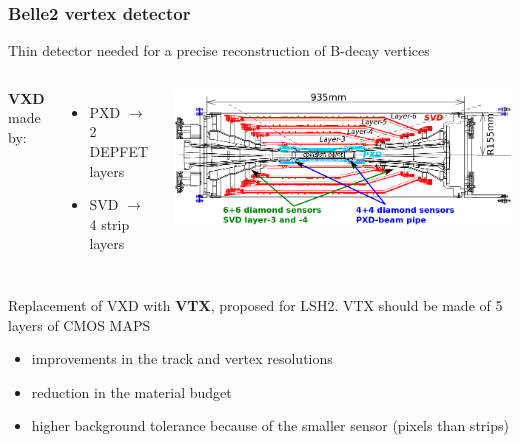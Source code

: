     \begin{frame}[noframenumbering]
        \frametitle{Belle2 vertex detector}
        Thin detector needed for a precise reconstruction of B-decay vertices
        \begin{columns}
                \textbf{VXD} made by:
                \begin{itemize}
                    \small
                    \item PXD $\rightarrow$ 2 DEPFET layers
                    \item SVD $\rightarrow$ 4 strip layers
                \end{itemize}
                \includegraphics[width=1.1\linewidth]{figures/pixel_detectors_usage/SVD_Belle2.png}
        \end{columns}
        Replacement of VXD with \textbf{VTX}, proposed for LSH2. VTX should be made of 5 layers of CMOS MAPS
        \begin{itemize}
            \item improvements in the track and vertex resolutions
            \item reduction in the material budget
            \item higher background tolerance because
            of the smaller sensor (pixels than strips)
        \end{itemize}
    \end{frame} 



